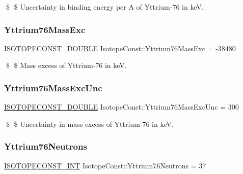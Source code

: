 \$ \$ Uncertainty in binding energy per A of Yttrium-\/76 in keV. \mbox{\label{group___isotope_const-_yttrium-_y76_ga1978d968a3e457bd43880069e78c425d}} 
\subsubsection{\texorpdfstring{Yttrium76\+Mass\+Exc}{Yttrium76MassExc}}
{\footnotesize\ttfamily \mbox{\hyperlink{group___isotope_const-_macros_ga8f45a7272ce02c0b4c65c44636ed719a}{I\+S\+O\+T\+O\+P\+E\+C\+O\+N\+S\+T\+\_\+\+D\+O\+U\+B\+LE}} Isotope\+Const\+::\+Yttrium76\+Mass\+Exc = -\/38480}

\$ \$ Mass excess of Yttrium-\/76 in keV. \mbox{\label{group___isotope_const-_yttrium-_y76_ga6757b7b5540a40a5ef5b59196b97b68c}} 
\subsubsection{\texorpdfstring{Yttrium76\+Mass\+Exc\+Unc}{Yttrium76MassExcUnc}}
{\footnotesize\ttfamily \mbox{\hyperlink{group___isotope_const-_macros_ga8f45a7272ce02c0b4c65c44636ed719a}{I\+S\+O\+T\+O\+P\+E\+C\+O\+N\+S\+T\+\_\+\+D\+O\+U\+B\+LE}} Isotope\+Const\+::\+Yttrium76\+Mass\+Exc\+Unc = 300}

\$ \$ Uncertainty in mass excess of Yttrium-\/76 in keV. \mbox{\label{group___isotope_const-_yttrium-_y76_ga164edba943948fd0395f7ad634c52eb7}} 
\subsubsection{\texorpdfstring{Yttrium76\+Neutrons}{Yttrium76Neutrons}}
{\footnotesize\ttfamily \mbox{\hyperlink{group___isotope_const-_macros_ga5f18360b3e99483a35c32d789e62621c}{I\+S\+O\+T\+O\+P\+E\+C\+O\+N\+S\+T\+\_\+\+I\+NT}} Isotope\+Const\+::\+Yttrium76\+Neutrons = 37}

